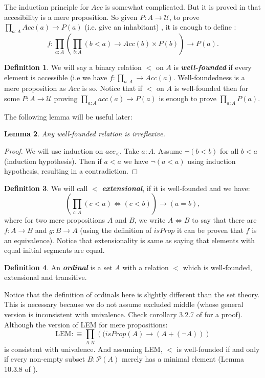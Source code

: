 \documentclass[11pt]{article}
\theoremstyle{definition}
\newtheorem{definition}{Definition}[section]
\theoremstyle{plain}
\newtheorem{lemma}[definition]{Lemma}
\theoremstyle{remark}
\newcommand{\U}{\mathscr{U}}
\newcommand{\Po}{\mathscr{P}}
\begin{document}
The induction principle for $Acc$ is somewhat complicated. But it is proved in \cite{Hott} 
that accesibility is a mere proposition. So given $P : A \to \U$, to prove 
$\prod_{a : A} Acc(a) \to P(a)$ (i.e. give an inhabitant) , it is enough to define :
\[ f : \prod_{a : A} \left( \prod_{b : A} (b<a) \to Acc(b) \times P(b) \right) \to P(a) .\]

\begin{definition}\label{D:WF}
We will say a binary relation $<$ on $A$ is \textbf{\textit{well-founded}} if every element
is accessible (i.e we have $f : \prod_{a : A} \to Acc(a)$. Well-foundedness is a mere 
proposition as $Acc$ is so. Notice that if $<$ on $A$ is well-founded then for some 
$P : A \to \U$ proving $\prod_{a:A} acc(a) \to P(a)$ is enough to prove $\prod_{a : A} P(a)$.
\end{definition}

The following lemma will be useful later:
\begin{lemma}\label{L:Wf implies irr}
Any well-founded relation is irreflexive.
\end{lemma}

\begin{proof}
We will use induction on $acc_<$. Take $a : A$. Assume $\neg(b < b)$ for all $b<a$ 
(induction hypothesis). Then if $a < a$ we have $\neg(a < a)$ using induction hypothesis,
resulting in a contradiction.
\end{proof}

\begin{definition}\label{D:Ext}
We will call $<$ \textbf{\textit{extensional}}, if it is well-founded and we have:
\[ \left( \prod_{c : A}  (c<a) \iff (c<b) \right) \to (a = b),\]
where for two mere propositions $A$ and $B$, we write $A\iff B$ to say that there are 
$f : A \to B$ and $g : B \to A$ (using the definition of $isProp$ it can be proven that $f$ 
is an equivalence). Notice that extensionality is same as saying that elements with equal 
initial segments are equal.
\end{definition} 

\begin{definition}
An \textbf{\textit{ordinal}} is a set $A$ with a relation $<$ which is well-founded, 
extensional and transitive.
\end{definition}

Notice that the definition of ordinals here is slightly different than the set theory. This
is necessary because we do not assume excluded middle (whose general version is 
inconsistent with univalence. Check corollary 3.2.7 of \cite{Hott} for a proof). Although
the version of LEM for mere propositions:
\[ \text{LEM} :\equiv \prod_{A : \U} \left((isProp(A) \to (A + (\neg A))\right) \]  
is consistent with univalence. And assuming LEM, $<$ is well-founded if and only if every
non-empty subset $B:\Po (A)$ merely has a minimal element (Lemma 10.3.8 of \cite{Hott}).
\end{document}
